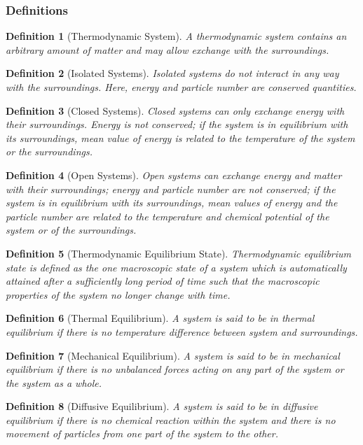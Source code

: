 \documentclass[a4paper]{article}
\newtheorem{defi}{Definition}[section]
\theoremstyle{new}
\begin{document}
\subsubsection*{Definitions}
\begin{defi}[Thermodynamic System]
A thermodynamic system contains an arbitrary amount of matter and may allow exchange with the surroundings.
\end{defi}
\begin{defi}[Isolated Systems]
Isolated systems do not interact in any way with the surroundings. Here, energy and particle number are conserved quantities. 
\end{defi}
\begin{defi}[Closed Systems]
Closed systems can only exchange energy with their surroundings. Energy is not conserved; if the system is in equilibrium with its surroundings, mean value of energy is related to the temperature of the system or the surroundings.
\end{defi}
\begin{defi}[Open Systems]
Open systems can exchange energy and matter with their surroundings; energy and particle number are not conserved; if the system is in equilibrium with its surroundings, mean values of energy and the particle number are related to the temperature and chemical potential of the system or of the surroundings.
\end{defi}
\begin{defi}[Thermodynamic Equilibrium State]
Thermodynamic equilibrium state is defined as the one macroscopic state of a system which is automatically attained after a sufficiently long period of time such that the macroscopic properties of the system no longer change with time.
\end{defi}
\begin{defi}[Thermal Equilibrium]
A system is said to be in thermal equilibrium if there is no temperature difference between system and surroundings.
\end{defi}
\begin{defi}[Mechanical Equilibrium]
A system is said to be in mechanical equilibrium if there is no unbalanced forces acting on any part of the system or the system as a whole.
\end{defi}
\begin{defi}[Diffusive Equilibrium]
A system is said to be in diffusive equilibrium if there is no chemical reaction within the system and there is no movement of particles from one part of the system to the other.
\end{defi}
\end{document}
